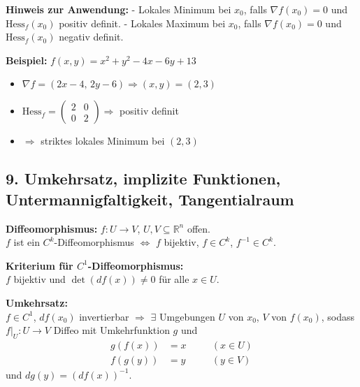 \textbf{Hinweis zur Anwendung:}
- Lokales Minimum bei $x_0$, falls $\nabla f(x_0) = 0$ und $\text{Hess}_f(x_0)$ positiv definit.
- Lokales Maximum bei $x_0$, falls $\nabla f(x_0) = 0$ und $\text{Hess}_f(x_0)$ negativ definit.

\textbf{Beispiel:} \( f(x, y) = x^2 + y^2 - 4x - 6y + 13 \)

\begin{itemize}
  \item \( \nabla f = (2x - 4,\, 2y - 6) \Rightarrow (x, y) = (2, 3) \)
  \item \( \text{Hess}_f =
  \begin{pmatrix}
  2 & 0 \\
  0 & 2
  \end{pmatrix} \Rightarrow \) positiv definit
  \item \( \Rightarrow \) striktes lokales Minimum bei \( (2, 3) \)
\end{itemize}

\subsection{9. Umkehrsatz, implizite Funktionen, Untermannigfaltigkeit, Tangentialraum}


\textbf{Diffeomorphismus:} $f : U \to V$, $U, V \subseteq \mathbb{R}^n$ offen.\\
$f$ ist ein $C^k$-Diffeomorphismus $\Leftrightarrow$ $f$ bijektiv, $f \in C^k$, $f^{-1} \in C^k$.

\vspace{0.5em}

\textbf{Kriterium für $C^1$-Diffeomorphismus:} \\
$f$ bijektiv und $\det(df(x)) \neq 0$ für alle $x \in U$.

\vspace{0.5em}

\textbf{Umkehrsatz:} \\
$f \in C^1$, $df(x_0)$ invertierbar $\Rightarrow$ $\exists$ Umgebungen $U$ von $x_0$, $V$ von $f(x_0)$, sodass $f|_U : U \to V$ Diffeo mit Umkehrfunktion $g$ und
\[
\begin{aligned}
g(f(x)) &= x \quad &&(x \in U) \\
f(g(y)) &= y \quad &&(y \in V)
\end{aligned}
\]
und $dg(y) = (df(x))^{-1}$.

\vspace{0.5em}

